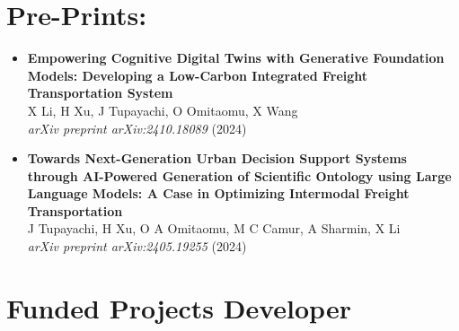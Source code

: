 \documentclass[10pt, letterpaper]{article}
\begin{document}
    \section*{Pre-Prints:}

    \begin{itemize}[left=0pt] 

        \item \textbf{Empowering Cognitive Digital Twins with Generative Foundation Models: Developing a Low-Carbon Integrated Freight Transportation System} \\
        X Li, H Xu, J Tupayachi, O Omitaomu, X Wang \\
        \textit{arXiv preprint arXiv:2410.18089} (2024) \\



        \item \textbf{Towards Next-Generation Urban Decision Support Systems through AI-Powered Generation of Scientific Ontology using Large Language Models: A Case in Optimizing Intermodal Freight Transportation} \\
        J Tupayachi, H Xu, O A Omitaomu, M C Camur, A Sharmin, X Li \\
        \textit{arXiv preprint arXiv:2405.19255} (2024)

    \end{itemize}
    



        \section*{Funded Projects Developer}
\end{document}

